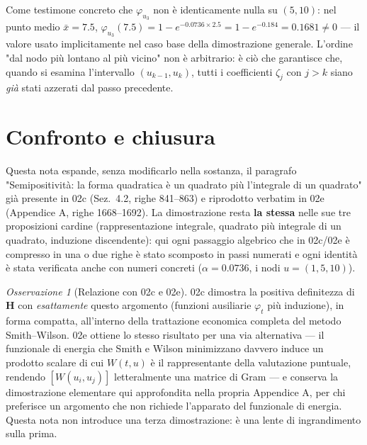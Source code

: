 \documentclass[11pt,a4paper]{article}
\theoremstyle{plain}
\theoremstyle{definition}
\theoremstyle{remark}
\newtheorem*{osservazione}{Osservazione}
\newcommand{\Hmat}{\mathbf{H}}
\begin{document}
Come testimone concreto che $\varphi_{u_3}$ non è identicamente nulla su $(5,10)$: nel punto
medio $\bar x=7.5$, $\varphi_{u_3}(7.5)=1-e^{-0.0736\times 2.5}=1-e^{-0.184}=0.1681\neq 0$ ---
il valore usato implicitamente nel caso base della dimostrazione generale. L'ordine
"dal nodo più lontano al più vicino" non è arbitrario: è ciò che garantisce che, quando si
esamina l'intervallo $(u_{k-1},u_k)$, tutti i coefficienti $\zeta_j$ con $j>k$ siano \emph{già}
stati azzerati dal passo precedente.

\section{Confronto e chiusura}
\label{sec:confronto}

Questa nota espande, senza modificarlo nella sostanza, il paragrafo "Semipositività: la forma
quadratica è un quadrato più l'integrale di un quadrato" già presente in 02c (Sez.~4.2, righe
841--863) e riprodotto verbatim in 02e (Appendice A, righe 1668--1692). La dimostrazione resta
\textbf{la stessa} nelle sue tre proposizioni cardine (rappresentazione integrale, quadrato più
integrale di un quadrato, induzione discendente): qui ogni passaggio algebrico che in 02c/02e è
compresso in una o due righe è stato scomposto in passi numerati e ogni identità è stata
verificata anche con numeri concreti ($\alpha=0.0736$, i nodi $u=(1,5,10)$).

\begin{osservazione}[Relazione con 02c e 02e]
02c dimostra la positiva definitezza di $\Hmat$ con \emph{esattamente} questo argomento (funzioni
ausiliarie $\varphi_t$ più induzione), in forma compatta, all'interno della trattazione
economica completa del metodo Smith--Wilson. 02e ottiene lo stesso risultato per una via
alternativa --- il funzionale di energia che Smith e Wilson minimizzano davvero induce un
prodotto scalare di cui $W(t,u)$ è il rappresentante della valutazione puntuale, rendendo
$[W(u_i,u_j)]$ letteralmente una matrice di Gram --- e conserva la dimostrazione elementare qui
approfondita nella propria Appendice A, per chi preferisce un argomento che non richiede
l'apparato del funzionale di energia. Questa nota non introduce una terza dimostrazione: è una
lente di ingrandimento sulla prima.
\end{osservazione}
\end{document}
